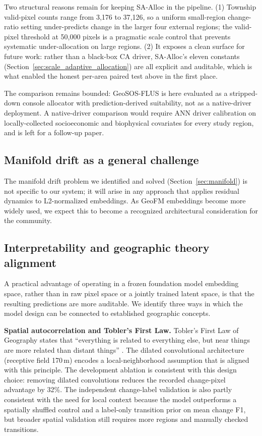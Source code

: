 \documentclass{article}
\begin{document}
Two structural reasons remain for keeping SA-Alloc in the pipeline. (1) Township valid-pixel counts range from 3{,}176 to 37{,}126, so a uniform small-region change-ratio setting under-predicts change in the larger four external regions; the valid-pixel threshold at 50{,}000 pixels is a pragmatic scale control that prevents systematic under-allocation on large regions. (2) It exposes a clean surface for future work: rather than a black-box CA driver, SA-Alloc's eleven constants (Section~\ref{sec:scale_adaptive_allocation}) are all explicit and auditable, which is what enabled the honest per-area paired test above in the first place.

The comparison remains bounded: GeoSOS-FLUS is here evaluated as a stripped-down console allocator with prediction-derived suitability, not as a native-driver deployment. A native-driver comparison would require ANN driver calibration on locally-collected socioeconomic and biophysical covariates for every study region, and is left for a follow-up paper.

\subsection{Manifold drift as a general challenge}

The manifold drift problem we identified and solved (Section~\ref{sec:manifold}) is not specific to our system; it will arise in any approach that applies residual dynamics to L2-normalized embeddings. As GeoFM embeddings become more widely used, we expect this to become a recognized architectural consideration for the community.

\subsection{Interpretability and geographic theory alignment}
\label{sec:interpretability}

A practical advantage of operating in a frozen foundation model embedding space, rather than in raw pixel space or a jointly trained latent space, is that the resulting predictions are more auditable. We identify three ways in which the model design can be connected to established geographic concepts.

\textbf{Spatial autocorrelation and Tobler's First Law.}
Tobler's First Law of Geography states that ``everything is related to everything else, but near things are more related than distant things'' \citep{tobler1970computer}. The dilated convolutional architecture (receptive field 170\,m) encodes a local-neighborhood assumption that is aligned with this principle. The development ablation is consistent with this design choice: removing dilated convolutions reduces the recorded change-pixel advantage by 32\%. The independent change-label validation is also partly consistent with the need for local context because the model outperforms a spatially shuffled control and a label-only transition prior on mean change F1, but broader spatial validation still requires more regions and manually checked transitions.
\end{document}
